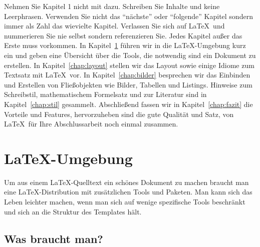 \documentclass[11pt,a4paper]{report}
\begin{document}

Nehmen Sie Kapitel 1 nicht mit dazu. Schreiben Sie Inhalte und keine
Leerphrasen. Verwenden Sie nicht das "`nächste"' oder "`folgende"' Kapitel
sondern immer als Zahl das wievielte Kapitel. 
Verlassen Sie sich auf \LaTeX\ und nummerieren Sie nie selbst sondern
referenzieren Sie. Jedes Kapitel außer das Erste muss vorkommen. 
In Kapitel~\ref{chap:latex} führen wir in die \LaTeX-Umgebung kurz ein und 
geben eine Übersicht über die Tools, die notwendig sind ein Dokument zu 
erstellen.
In Kapitel~\ref{chap:layout} stellen wir das Layout sowie einige Idiome 
zum Textsatz mit \LaTeX\ vor. 
In Kapitel~\ref{chap:bilder} besprechen wir das Einbinden und Erstellen 
von Fließobjekten wie Bilder, Tabellen und Listings.
Hinweise zum Schreibstil, mathematischem Formelsatz und zur Literatur sind 
in Kapitel~\ref{chap:stil} gesammelt.
Abschließend fassen wir in Kapitel~\ref{chap:fazit} die Vorteile und Features,
hervorzuheben sind die gute Qualität und Satz,
von \LaTeX\ für Ihre Abschlussarbeit noch einmal zusammen.


\chapter{\LaTeX-Umgebung} \label{chap:latex}

Um aus einem \LaTeX-Quelltext ein schönes Dokument zu machen braucht man 
eine \LaTeX-Distribution mit zusätzlichen Tools und Paketen. 
Man kann sich das Leben leichter machen, wenn man sich auf wenige spezifische
Tools beschränkt und sich an die Struktur des Templates hält.


\section{Was braucht man?} \label{sec:was}
\end{document}
